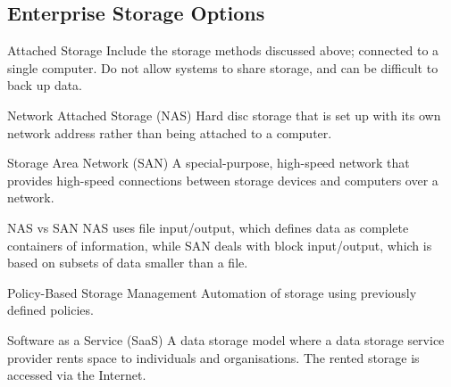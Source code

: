 \documentclass[\main/notes.tex]{subfiles}
\begin{document}
			\subsection{Enterprise Storage Options}
				\begin{sidenote}{Attached Storage}
					Include the storage methods discussed above; connected to a single computer. Do not allow systems to share storage, and can be difficult to back up data.
				\end{sidenote}
				\begin{definition}{Network Attached Storage (NAS)}
					Hard disc storage that is set up with its own network address rather than being attached to a computer.
				\end{definition}
				\begin{definition}{Storage Area Network (SAN)}
					A special-purpose, high-speed network that provides high-speed connections between storage devices and computers over a network.
				\end{definition}
				\begin{sidenote}{NAS vs SAN}
					NAS uses file input/output, which defines data as complete containers of information, while SAN deals with block input/output, which is based on subsets of data smaller than a file.
				\end{sidenote}
				\begin{definition}{Policy-Based Storage Management}
					Automation of storage using previously defined policies.
				\end{definition}
				\begin{definition}{Software as a Service (SaaS)}
					A data storage model where a data storage service provider rents space to individuals and organisations. The rented storage is accessed via the Internet.
				\end{definition}
	\vbox{}
\end{document}
